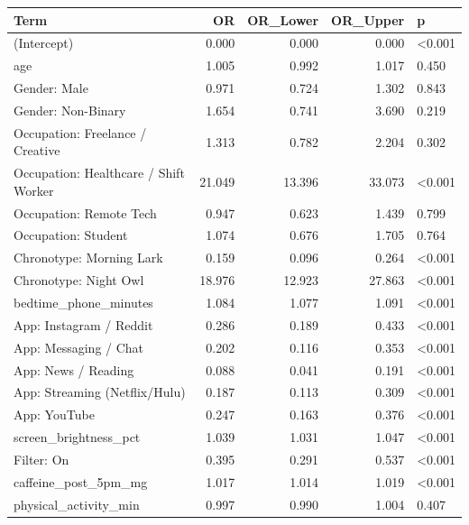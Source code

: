 
\begin{tabular}{lrrrl}
\toprule
Term & OR & OR\_Lower & OR\_Upper & p\\
\midrule
(Intercept) & 0.000 & 0.000 & 0.000 & <0.001\\
age & 1.005 & 0.992 & 1.017 & 0.450\\
Gender: Male & 0.971 & 0.724 & 1.302 & 0.843\\
Gender: Non-Binary & 1.654 & 0.741 & 3.690 & 0.219\\
Occupation: Freelance / Creative & 1.313 & 0.782 & 2.204 & 0.302\\
Occupation: Healthcare / Shift Worker & 21.049 & 13.396 & 33.073 & <0.001\\
Occupation: Remote Tech & 0.947 & 0.623 & 1.439 & 0.799\\
Occupation: Student & 1.074 & 0.676 & 1.705 & 0.764\\
Chronotype: Morning Lark & 0.159 & 0.096 & 0.264 & <0.001\\
Chronotype: Night Owl & 18.976 & 12.923 & 27.863 & <0.001\\
bedtime\_phone\_minutes & 1.084 & 1.077 & 1.091 & <0.001\\
App: Instagram / Reddit & 0.286 & 0.189 & 0.433 & <0.001\\
App: Messaging / Chat & 0.202 & 0.116 & 0.353 & <0.001\\
App: News / Reading & 0.088 & 0.041 & 0.191 & <0.001\\
App: Streaming (Netflix/Hulu) & 0.187 & 0.113 & 0.309 & <0.001\\
App: YouTube & 0.247 & 0.163 & 0.376 & <0.001\\
screen\_brightness\_pct & 1.039 & 1.031 & 1.047 & <0.001\\
Filter: On & 0.395 & 0.291 & 0.537 & <0.001\\
caffeine\_post\_5pm\_mg & 1.017 & 1.014 & 1.019 & <0.001\\
physical\_activity\_min & 0.997 & 0.990 & 1.004 & 0.407\\
\bottomrule
\end{tabular}
